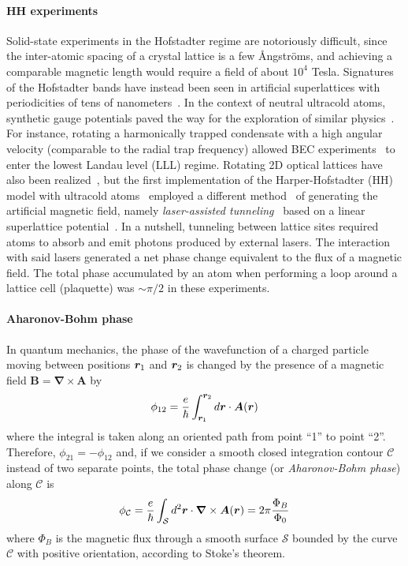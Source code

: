 \paragraph{HH experiments}
Solid-state experiments in the Hofstadter regime are notoriously
difficult, since the inter-atomic spacing of a crystal lattice is a
few {\AA}ngstr\"oms, and achieving a comparable magnetic length would
require a field of about $10^4$ Tesla. Signatures of the Hofstadter
bands have instead been seen in artificial superlattices with
periodicities of tens of
nanometers~\cite{dean2013hofstadter,yu2014hierarchy}. In the context
of neutral ultracold atoms, synthetic gauge potentials paved the way
for the exploration of similar
physics~\cite{dalibardrmp2011,goldman_repprog_2014}. For instance,
rotating a harmonically trapped condensate with a high angular
velocity (comparable to the radial trap frequency) allowed BEC
experiments~\cite{PhysRevLett.92.040404} to enter the lowest Landau
level (LLL) regime. Rotating 2D optical lattices have also been
realized~\cite{PhysRevLett.104.050404}, but the first implementation
of the Harper-Hofstadter (HH) model with ultracold
atoms~\cite{aidelsburger2013hh,miyake2013hh} employed a different
method~\cite{goldman_repprog_2014} of generating the artificial
magnetic field, namely \textit{laser-assisted
  tunneling}~\cite{1367-2630-5-1-356} based on a linear superlattice
potential~\cite{1367-2630-12-3-033007}. In a nutshell, tunneling
between lattice sites required atoms to absorb and emit photons
produced by external lasers. The interaction with said lasers
generated a net phase change equivalent to the flux of a magnetic
field. The total phase accumulated by an atom when performing a loop
around a lattice cell (plaquette) was $\sim \pi/2$ in these
experiments.

\paragraph{Aharonov-Bohm phase}
In quantum mechanics, the phase of the wavefunction of a charged
particle moving between positions $\bm{r}_1$ and $\bm{r}_2$ is changed by
the presence of a magnetic field $\bm{B} = \bm{\nabla} \times \bm{A}$
by~\cite{feynman1979lectures}
%
\begin{equation}\label{eq:AB-phase}
  \phi_{12} = \frac{e}{\hbar}\int_{{\bm{r}}_{1}}^{{\bm{r}}_{2}} d\bm{r} \cdot \bm{A}(\bm{r})
\end{equation}
% 
where the integral is taken along an oriented path from point ``1'' to
point ``2''. Therefore, $\phi_{21} = -\phi_{12}$ and, if we consider a
smooth closed integration contour $\mathcal{C}$ instead of two
separate points, the total phase change (or \textit{Aharonov-Bohm
  phase}) along $\mathcal{C}$ is
%
\begin{equation}\label{eq:AB-closed}
  \phi_{\mathcal{C}} = \frac{e}{\hbar}\int_{\mathcal{S}}
  d^2 \bm{r} \cdot \bm{\nabla} \times
  \bm{A}(\bm{r}) = 2\pi \frac{\Phi_B}{\Phi_0}
\end{equation}
% 
where $\Phi_B$ is the magnetic flux through a smooth surface
$\mathcal{S}$ bounded by the curve $\mathcal{C}$ with positive
orientation, according to Stoke's theorem.

